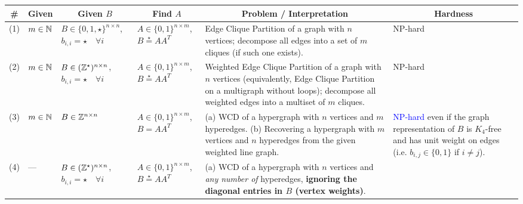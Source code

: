 \begin{table*}[ht]
  \centering
  \small

  \begin{tabular}{|c|p{}|p{}|p{}|p{}|p{}|}
    \hline
    \#
    &Given
    &\multicolumn{1}{c|}{Given $B$} 
    &\multicolumn{1}{c|}{Find $A$} 
    &\multicolumn{1}{c|}{Problem / Interpretation}
    &\multicolumn{1}{c|}{Hardness}
    \\
    \hline
    (1) & $m \in \mathbb{N}$ & $B \in \{0,1,\star \}^{n \times n}$,\newline $b_{i,i}=\star\quad\forall i$
     & $A \in \{0,1\}^{n \times m}$,\newline $B\stackrel{\star}{=}AA^T$
     & Edge Clique Partition of a graph with $n$ vertices; decompose all edges into a set of $m$ cliques (if such one exists).
     & NP-hard \cite{shaohan1988complexity}\\
    \hline
    (2) & $m \in \mathbb{N}$ & $B \in (\mathbb{Z}^\star)^{n \times n}$,\newline $b_{i,i}=\star \quad\forall i$
     & $A \in \{0,1\}^{n \times m}$,\newline $B\stackrel{\star}{=}AA^T$
     & Weighted Edge Clique Partition of a graph with $n$ vertices
     (equivalently, Edge Clique Partition on a multigraph without loops);
     decompose all weighted edges into a multiset of $m$ cliques.
     & NP-hard \cite{feldmann_fixed-parameter_2020,cooley_parameterized_2021}\\
    \hline
    (3) & $m \in \mathbb{N}$ & $B \in \mathbb{Z}^{n \times n}$
    & $A \in \{0,1\}^{n \times m}$,\newline $B=AA^T$
    & (a) WCD of a hypergraph with $n$ vertices and $m$ hyperedges.
    (b) Recovering a hypergraph with $m$ vertices and $n$ hyperedges from the given weighted line graph.
    & \textcolor{blue}{NP-hard}\newline
    even if the graph representation of $B$ is $K_4$-free and has unit weight on edges\newline
    (i.e. $b_{i,j} \in \{0,1\}$ if $i\neq j$).
    \\
    \hline
    (4) & --- & $B \in (\mathbb{Z}^\star)^{n \times n}$,\newline $b_{i,i}=\star \quad\forall i$
    & $A \in \{0,1\}^{n \times m}$,\newline $B\stackrel{\star}{=}AA^T$
    & (a) WCD of a hypergraph with $n$ vertices 
    and \textit{any number of} hyperedges, \textbf{ignoring the diagonal entries in $B$ (vertex weights)}.

\end{tabular}
\end{table*}
